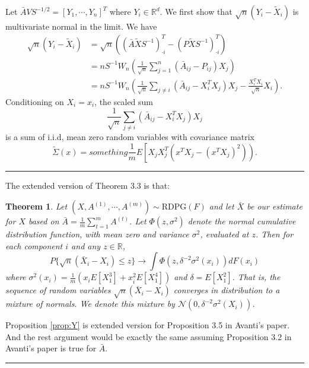 \documentclass[a4paper]{article}
\newenvironment{proof}{{\bf Proof:  }}{\hfill\rule{2mm}{2mm}}
\newtheorem{theorem}[fact]{Theorem}
\begin{document}
\begin{proof}
Let $\bar{A} V S^{-1/2} = [Y_1, \cdots, Y_n]^T$ where $Y_i \in \mathbb{R}^d$. We first show that $\sqrt{n} (Y_i - \tilde{X}_i)$ is multivariate normal in the limit. We have
\begin{align*}
	\sqrt{n}(Y_i - \tilde{X}_i) & = \sqrt{n} \left( (\bar{A} \tilde{X} S^{-1})^T_{\cdot i}  - (P \tilde{X} S^{-1})^T_{\cdot i}\right) \\
    & = n S^{-1} W_n \left( \frac{1}{\sqrt{n}} \sum_{j=1}^n (\bar{A}_{ij} - P_{ij}) X_j \right) \\
    & = n S^{-1} W_n \left( \frac{1}{\sqrt{n}} \sum_{j \ne i}(\bar{A}_{ij} - X_i^T X_j)X_j - \frac{X_i^T X_i}{\sqrt{n}} X_i \right).
\end{align*}
Conditioning on $X_i = x_i$, the scaled sum
\[
	\frac{1}{\sqrt{n}} \sum_{j \ne i}(\bar{A}_{ij} - X_i^T X_j)X_j
\]
is a sum of i.i.d, mean zero random variables with covariance matrix
\[
	\tilde{\Sigma}(x) = something \frac{1}{m} E \left[ X_j X_j^T (x^T X_j - (x^T X_j)^2 ) \right).
\]
\end{proof}































\newpage

The extended version of Theorem 3.3 is that:

\begin{theorem}
\label{thm:clt}
Let $(X, A^{(1)}, \cdots, A^{(m)}) \sim \mathrm{RDPG}(F)$ and let $\bar{X}$ be our estimate for $X$ based on $\bar{A} = \frac{1}{m} \sum_{t = 1}^m A^{(t)}$. Let $\Phi(z, \sigma^2)$ denote the normal cumulative distribution function, with mean zero and variance $\sigma^2$, evaluated at $z$. Then for each component $i$ and any $z \in \mathbb{R}$,
\[
	P\{ \sqrt{n}(\bar{X}_i - X_i) \le z \} \rightarrow \int \Phi(z, \delta^{-2} \sigma^2(x_i)) dF(x_i)
\]
where $\sigma^2(x_i) = \frac{1}{m} \left( x_i E[X_1^3] + x_i^2 E[X_1^4] \right)$ and $\delta = E[X_1^2]$. That is, the sequence of random variables $\sqrt{n}(\bar{X}_i - X_i)$ converges in distribution to a mixture of normals. We denote this mixture by $\mathcal{N}(0, \delta^{-2} \sigma^2(X_i))$.
\end{theorem}
\begin{proof}
Proposition \ref{prop:Y} is extended version for Proposition 3.5 in Avanti's paper. And the rest argument would be exactly the same assuming Proposition 3.2 in Avanti's paper is true for $\bar{A}$.
\end{proof}
\end{document}
